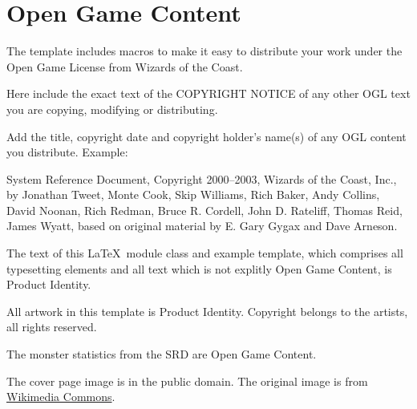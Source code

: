 \documentclass[a4paper,serif]{module}       %
\begin{document}
\lipsum

\section{Open Game Content}
\label{ogl}

The template includes macros to make it easy to distribute your work under the Open Game License from Wizards of the Coast.

\begin{ogl}
\item Here include the exact text of the COPYRIGHT NOTICE of any other OGL text you are copying, modifying or distributing.
\item Add the title, copyright date and copyright holder's name(s) of any OGL content you distribute. Example:
\item System Reference Document, Copyright 2000--2003, Wizards of the Coast, Inc., by Jonathan Tweet, Monte Cook, Skip Williams, Rich Baker, Andy Collins,
David Noonan, Rich Redman, Bruce R. Cordell, John D. Rateliff, Thomas Reid, James Wyatt, based on original material by E. Gary Gygax and Dave Arneson.
\end{ogl}

\begin{productidentity}
\item The text of this \LaTeX~module class and example template, which comprises all typesetting elements and all text which is not explitly Open Game Content, is Product Identity.
\modulecopyright

\item All artwork in this template is Product Identity. Copyright belongs to the artists, all rights reserved.
\end{productidentity}

\begin{opengamecontent}
\item The monster statistics from the SRD are Open Game Content.
\item The cover page image is in the public domain. The original image is from 
\href{https://commons.wikimedia.org/wiki/File:The_Great_Pyramid_and_the_Sphinx.jpg}{Wikimedia Commons}.
\end{opengamecontent}


\tableofcontents

\end{document}
